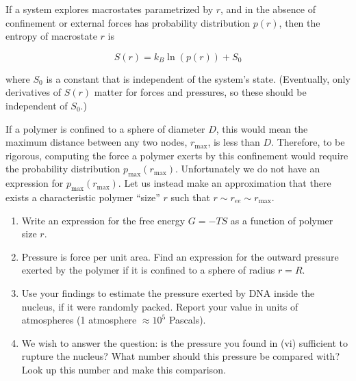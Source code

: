 \documentclass[
  letterpaper,
  DIV=11,
  numbers=noendperiod]{scrartcl}
\providecommand{\tightlist}{%
  \setlength{\itemsep}{0pt}\setlength{\parskip}{0pt}}
\begin{document}
If a system explores macrostates parametrized by \(r\), and in the absence of confinement or external forces has probability distribution \(p(r)\), then the entropy of macrostate \(r\) is

\[
S(r) = k_B \ln \left( p(r)\right) + S_0
\]

where \(S_0\) is a constant that is independent of the system's state.
(Eventually, only derivatives of \(S(r)\) matter for forces and pressures, so these should be independent of \(S_0\).)

If a polymer is confined to a sphere of diameter \(D\), this would mean the maximum distance between any two nodes, \(r_\mathrm{max}\), is less than \(D\).
Therefore, to be rigorous, computing the force a polymer exerts by this confinement would require the probability distribution \(p_\mathrm{max}(r_\mathrm{max})\).
Unfortunately we do not have an expression for \(p_\mathrm{max}(r_\mathrm{max})\).
Let us instead make an approximation that there exists a characteristic polymer ``size'' \(r\) such that \(r \sim r_{ee} \sim r_\mathrm{max}\).

\begin{enumerate}
\def\labelenumi{\roman{enumi}.}
\setcounter{enumi}{3}
\tightlist
\item
  Write an expression for the free energy \(G = -T S\) as a function of polymer size \(r\).
\item
  Pressure is force per unit area.
  Find an expression for the outward pressure exerted by the polymer if it is confined to a sphere of radius \(r=R\).
\item
  Use your findings to estimate the pressure exerted by DNA inside the nucleus, if it were randomly packed.
  Report your value in units of atmospheres (1 atmosphere \(\approx 10^5\) Pascals).
\item
  We wish to answer the question: is the pressure you found in (vi) sufficient to rupture the nucleus?
  What number should this pressure be compared with?
  Look up this number and make this comparison.
\end{enumerate}
\end{document}
